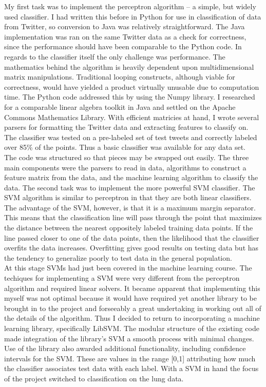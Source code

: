 \documentclass{article}
\begin{document}
 My first task was to implement the perceptron algorithm -- a simple, but widely used classifier. I had written this before in Python for use in classification of data from Twitter, so conversion to Java was relatively straightforward. The Java implementation was ran on the same Twitter data as a check for correctness, since the performance should have been comparable to the Python code. In regards to the classifier itself the only challenge was performance. The mathematics behind the algorithm is heavily dependent upon multidimensional matrix manipulations. Traditional looping constructs, although viable for correctness, would have yielded a product virtually unusable due to computation time. The Python code addressed this by using the Numpy library. I researched for a comparable linear algebra toolkit in Java and settled on the Apache Commons Mathematics Library. With efficient matricies at hand, I wrote several parsers for formatting the Twitter data and extracting features to classify on. The classifier was tested on a pre-labeled set of test tweets and correctly labeled over 85\% of the points. Thus a basic classifier was available for any data set.\\
 
 The code was structured so that pieces may be swapped out easily. The three main components were the parsers to read in data, algorithms to construct a feature matrix from the data, and the machine learning algorithm to classify the data. The second task was to implement the more powerful SVM classifier. The SVM algorithm is similar to perceptron in that they are both linear classifiers. The advantage of the SVM, however, is that it is a maximum margin separator. This means that the classification line will pass through the point that maximizes the distance between the nearest oppositely labeled training data points. If the line passed closer to one of the data points, then the likelihood that the classifier overfits the data increases. Overfitting gives good results on testing data but has the tendency to generalize poorly to test data in the general population.\\
 
 At this stage SVMs had just been covered in the machine learning course. The techiques for implementing a SVM were very different from the perceptron algorithm and required linear solvers. It became apparent that implementing this myself was not optimal because it would have required yet another library to be brought in to the project and forseeably a great undertaking in working out all of the details of the algorithm. Thus I decided to return to incorporating a machine learning library, specifically LibSVM. The modular structure of the existing code made integration of the library's SVM a smooth process with minimal changes. Use of the library also awarded additional functionality, including confidence intervals for the SVM. These are values in the range [0,1] attributing how much the classifier associates test data with each label. With a SVM in hand the focus of the project switched to classification on the lung data. \cite{SVM}\\
\end{document}
